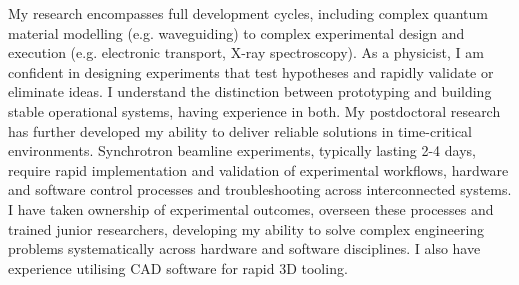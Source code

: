 \documentclass[10pt,a4paper,ragged2e,withhyper,paragraphstrue]{altacv}
\begin{document}
{    %
    My research encompasses full development cycles, including complex quantum material modelling (e.g. waveguiding) to complex experimental design and execution (e.g. electronic transport, X-ray spectroscopy). As a physicist, I am confident in designing experiments that test hypotheses and rapidly validate or eliminate ideas. I understand the distinction between prototyping and building stable operational systems, having experience in both.
    My postdoctoral research has further developed my ability to deliver reliable solutions in time-critical environments. Synchrotron beamline experiments, typically lasting 2-4 days, require rapid implementation and validation of experimental workflows, hardware and software control processes and troubleshooting across interconnected systems. I have taken ownership of experimental outcomes, overseen these processes and trained junior researchers, developing my ability to solve complex engineering problems systematically across hardware and software disciplines. I also have experience utilising CAD software for rapid 3D tooling.

}
\end{document}
